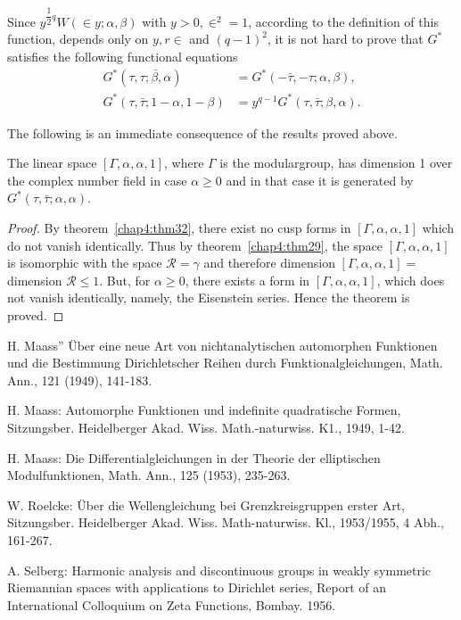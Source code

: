 Since $y^{\dfrac{1}{2}q}W(\in y;\alpha,\beta)$ with
$y>0,\in^2=1$, according to the definition of this function,
depends only on $y,r\in$ and $(q-1)^2$, it is not hard to
prove that $G^{\ast}$ satisfies the following functional equations 
\begin{align*}
G^{\ast} (\tau,\bar{\tau;\beta,\alpha}) & = G^{\ast} (-\bar{\tau},
-\tau;\alpha, \beta),\\
G^{\ast} (\tau,\bar{\tau}; 1-\alpha, 1-\beta) & = y^{q-1} G^{\ast}
(\tau,\bar{\tau};\beta, \alpha).
\end{align*}

The following is an immediate consequence of the results proved above.

\begin{thm}\label{chap4:thm34}
The linear \pageoriginale space $[\Gamma, \alpha,\alpha,1]$, where
$\Gamma$ is the modular\break group, has dimension 1 over the complex number
field in case $\alpha\geq 0$ and in that case it is generated by
$G^{\ast}(\tau,\bar{\tau};\alpha,\alpha)$.
\end{thm}

\begin{proof}
By theorem~\ref{chap4:thm32}, there exist no cusp forms in $[\Gamma,\alpha,\alpha,1]$
which do not vanish identically. Thus by theorem~\ref{chap4:thm29}, the space
$[\Gamma,\alpha,\alpha,1]$ is isomorphic with the space
$\mathscr{R}=\gamma$ and therefore dimension
$[\Gamma,\alpha,\alpha,1]=$ dimension $\mathscr{R}\leq 1$. But, for
$\alpha \geq 0$, there exists a form in $[\Gamma, \alpha, \alpha, 1]$,
which does not vanish identically, namely, the Eisenstein
series. Hence the theorem is proved.
\end{proof}

\begin{thebibliography}{99}
 H. Maass'' \"Uber eine neue Art von nichtanalytischen
  automorphen Funktionen und die Bestimmung Dirichletscher Reihen
  durch Funktionalgleichungen, Math. Ann., 121 (1949), 141-183.

 H. Maass: Automorphe Funktionen und indefinite
  quadratische Formen, Sitzungsber. Heidelberger
  Akad. Wiss. Math.-naturwiss. K1., 1949, 1-42.

 H. Maass: Die Differentialgleichungen in der Theorie
  der elliptischen Modulfunktionen, Math. Ann., 125 (1953), 235-263.

 W. Roelcke: \"Uber die Wellengleichung bei
  Grenzkreisgruppen erster Art, Sitzungsber. Heidelberger
  Akad. Wiss. Math-naturwiss. Kl., 1953/1955, 4 Abh., 161-267.

 A. Selberg: Harmonic analysis and discontinuous groups
  in weakly symmetric Riemannian spaces with applications to Dirichlet
  series, Report of an International Colloquium on Zeta Functions,
  Bombay. 1956.
\end{thebibliography}


